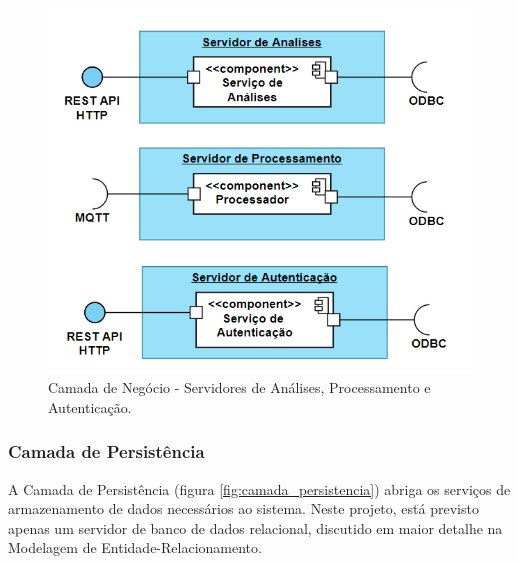 \begin{figure}[H]
    \centering
    \includegraphics[scale=0.50]{figuras/projeto/software/camada_negocios.PNG}
    \caption{Camada de Negócio - Servidores de Análises, Processamento e Autenticação.}
    \label{fig:camada_negocios}
\end{figure}

\subsubsection{Camada de Persistência}

A Camada de Persistência (figura \ref{fig:camada_persistencia}) abriga os serviços de armazenamento de dados necessários ao sistema. Neste projeto, está previsto apenas um servidor de banco de dados relacional, discutido em maior detalhe na Modelagem de Entidade-Relacionamento.

